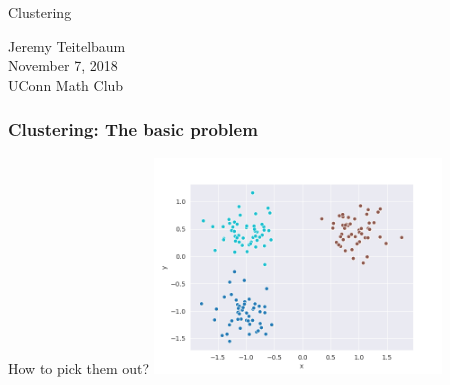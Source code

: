 \documentclass[colorlinks=true,linkcolor=blue]{beamer}
\begin{document}
\begin{frame}
  \begin{center}

    {\Large Clustering}
    \end{center}
  \vskip 1in
{\small
Jeremy Teitelbaum \\
November 7, 2018 \\
UConn Math Club
}
\end{frame}
\begin{frame}
  \frametitle{Clustering: The basic problem}
\begin{center}
\end{center}
\end{frame}
\begin{frame}
  \begin{block}{How to pick them out?}
          \includegraphics[width=3in]{../png/basic_1.png}
\end{block}
\end{frame}
\end{document}
